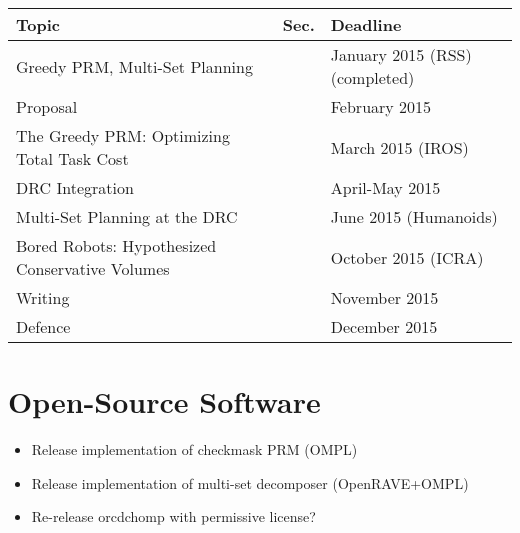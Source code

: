 \begin{center}
\begin{tabular}{lll}
\hline
Topic & Sec. & Deadline \\
\hline
Greedy PRM, Multi-Set Planning & & January 2015 (RSS) (completed) \\
Proposal & & February 2015 \\
The Greedy PRM: Optimizing Total Task Cost & & March 2015 (IROS) \\
DRC Integration & & April-May 2015 \\
Multi-Set Planning at the DRC & & June 2015 (Humanoids) \\
Bored Robots: Hypothesized Conservative Volumes & & October 2015 (ICRA) \\
Writing & & November 2015 \\
Defence & & December 2015 \\
\hline
\end{tabular}
\end{center}

\section{Open-Source Software}

\begin{itemize}
\item Release implementation of checkmask PRM (OMPL)
\item Release implementation of multi-set decomposer (OpenRAVE+OMPL)
\item Re-release orcdchomp with permissive license?
\end{itemize}
